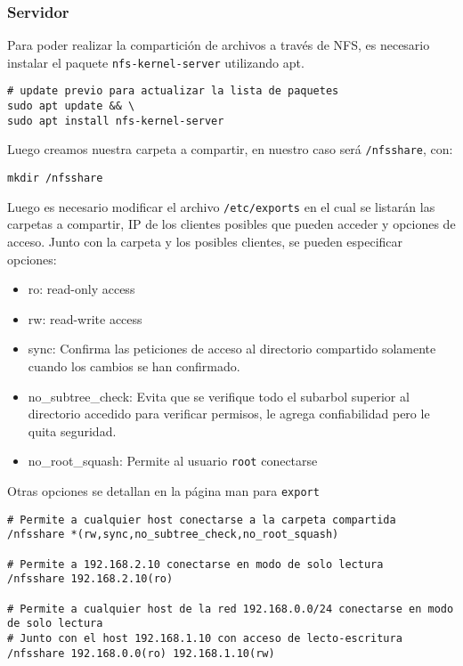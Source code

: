 \subsubsection{Servidor}

Para poder realizar la compartición de archivos a través de NFS, es necesario instalar el paquete \texttt{nfs-kernel-server} utilizando apt.

\begin{lstlisting}
# update previo para actualizar la lista de paquetes
sudo apt update && \
sudo apt install nfs-kernel-server
\end{lstlisting}

Luego creamos nuestra carpeta a compartir, en nuestro caso será \texttt{/nfsshare}, con:

\begin{lstlisting}
mkdir /nfsshare
\end{lstlisting}

Luego es necesario modificar el archivo \texttt{/etc/exports} en el cual se listarán las carpetas a compartir, IP de los clientes posibles que pueden acceder y opciones de acceso. Junto con la carpeta y los posibles clientes, se pueden especificar opciones:

\begin{itemize}
    \item ro: read-only access
    \item rw: read-write access
    \item sync: Confirma las peticiones de acceso al directorio compartido solamente cuando los cambios se han confirmado.
    \item no\_subtree\_check: Evita que se verifique todo el subarbol superior al directorio accedido para verificar permisos, le agrega confiabilidad pero le quita seguridad. 
    \item no\_root\_squash: Permite al usuario \texttt{root} conectarse
\end{itemize}

    Otras opciones se detallan en la página man para \texttt{export} 

\begin{lstlisting}
# Permite a cualquier host conectarse a la carpeta compartida
/nfsshare *(rw,sync,no_subtree_check,no_root_squash)

# Permite a 192.168.2.10 conectarse en modo de solo lectura
/nfsshare 192.168.2.10(ro)

# Permite a cualquier host de la red 192.168.0.0/24 conectarse en modo de solo lectura
# Junto con el host 192.168.1.10 con acceso de lecto-escritura
/nfsshare 192.168.0.0(ro) 192.168.1.10(rw)
\end{lstlisting}

